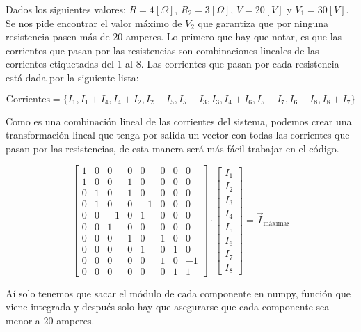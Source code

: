 \documentclass[letter, 11pt]{article}
\begin{document}
Dados los siguientes valores: $R=4[\Omega]$, $R_2=3[\Omega]$, $V=20[V]$ y $V_1=30[V]$. Se nos pide encontrar el valor máximo de $V_2$ que garantiza que por ninguna resistencia pasen más de 20 amperes. Lo primero que hay que notar, es que las corrientes que pasan por las resistencias son combinaciones lineales de las corrientes etiquetadas del 1 al 8. Las corrientes que pasan por cada resistencia está dada por la siguiente lista:


\begin{equation}
  \text{Corrientes}=\{I_1,I_1+I_4,I_4+I_2,I_2-I_5,I_5-I_3,I_3,I_4+I_6,I_5+I_7,I_6-I_8,I_8+I_7\}
\end{equation}


Como es una combinación lineal de las corrientes del sistema, podemos crear una transformación lineal que tenga por salida un vector con todas las corrientes que pasan por las resistencias, de esta manera será más fácil trabajar en el código.



\begin{equation*}
\begin{bmatrix}
1 & 0 &  0  & 0 & 0  & 0 & 0 & 0 \\
1 & 0 &  0  & 1 & 0  & 0 & 0 & 0 \\
0 & 1 &  0  & 1 & 0  & 0 & 0 & 0 \\
0 & 1 &  0  & 0 & -1 & 0 & 0 & 0 \\
0 & 0 &  -1 & 0 & 1  & 0 & 0 & 0 \\
0 & 0 &  1  & 0 & 0  & 0 & 0 & 0 \\
0 & 0 &  0  & 1 & 0  & 1 & 0 & 0 \\
0 & 0 &  0  & 0 & 1  & 0 & 1 & 0 \\
0 & 0 &  0  & 0 & 0  & 1 & 0 & -1 \\
0 & 0 &  0  & 0 & 0  & 0 & 1 & 1
\end{bmatrix}
\cdot
\begin{bmatrix}
I_1\\
I_2\\
I_3\\
I_4\\
I_5\\
I_6\\
I_7\\
I_8
\end{bmatrix}
=
\vec{I}_\text{máximas}
\end{equation*}


Aí solo tenemos que sacar el módulo de cada componente en numpy, función que viene integrada y después solo hay que asegurarse que cada componente sea menor a 20 amperes.
\end{document}
